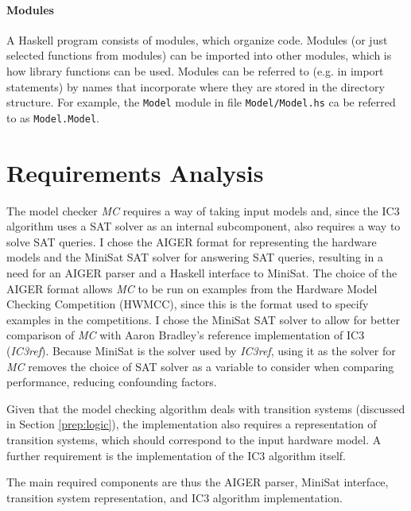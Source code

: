 \documentclass[12pt,a4paper,twoside,openright]{report}
\begin{document}
\paragraph{Modules}{
A Haskell program consists of modules, which organize code.
Modules (or just selected functions from modules) can be imported into other
modules, which is how library functions can be used. Modules can be referred
to (e.g. in import statements) by names that incorporate where they are
stored in the directory structure. For example, the \verb,Model, module in file
\verb,Model/Model.hs, ca be referred to as \verb,Model.Model,.
}


\section{Requirements Analysis}
\label{prep:requirements}


The model checker \emph{MC} requires a way of taking input models and, since
the IC3 algorithm uses a SAT solver as an internal subcomponent, also
requires a way to solve SAT queries.
I chose the AIGER format for representing the hardware models and the
MiniSat SAT solver for answering SAT queries, resulting in a need for an
AIGER parser and a Haskell interface to MiniSat. The choice of
the AIGER format allows \emph{MC} to be run on examples from
the Hardware Model Checking Competition (HWMCC), since this is the format used
to specify examples in the competitions. I chose the MiniSat SAT
solver to allow for better comparison of \emph{MC}
with Aaron Bradley's reference implementation of IC3 (\emph{IC3ref})\cite{refic3}.
Because MiniSat is the solver used by \emph{IC3ref}, using it as the solver
for \emph{MC} removes the
choice of SAT solver as a variable to consider when comparing performance,
reducing confounding factors.

Given that the model checking algorithm deals with transition systems
(discussed in Section \ref{prep:logic}), the implementation also requires a representation of
transition systems, which should correspond to the input hardware model.
A further requirement is the implementation of the
IC3 algorithm itself.

The main required components are thus the AIGER parser, MiniSat interface,
transition system representation, and IC3 algorithm implementation.
\end{document}
